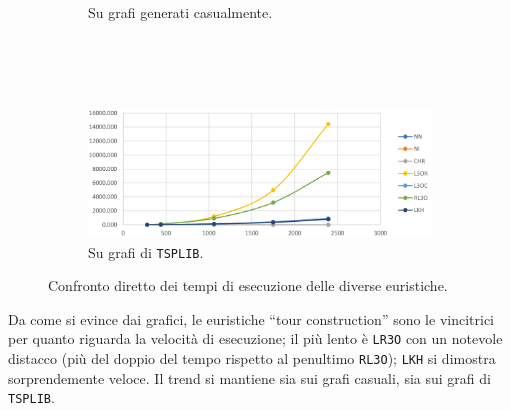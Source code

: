 \begin{figure}[H]
\begin{subfigure}{\linewidth}
        \caption*{Su grafi generati casualmente.}
    \end{subfigure}
    \ \\
    \ \\
    \ \\
    \begin{subfigure}{\linewidth}
        \centering
        \includegraphics[width=300pt]{img/GraficoTempiTsplib.png}
        \caption*{Su grafi di \texttt{TSPLIB}.}
    \end{subfigure}
    \caption{Confronto diretto dei tempi di esecuzione delle diverse euristiche.}
\end{figure}

Da come si evince dai grafici, le euristiche ``tour construction'' sono le vincitrici per 
quanto riguarda la velocità di esecuzione; il più lento è \texttt{LR3O} con un notevole distacco (più del doppio 
del tempo rispetto al penultimo \texttt{RL3O}); \texttt{LKH} si dimostra sorprendemente veloce. Il trend si 
mantiene sia sui grafi casuali, sia sui grafi di \texttt{TSPLIB}.

